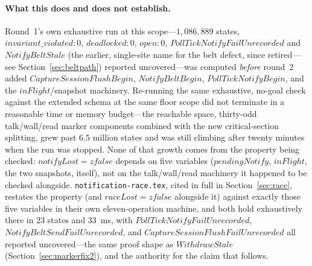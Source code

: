 \documentclass[a4paper,10pt,fleqn]{article}
\begin{document}
\paragraph{What this does and does not establish.}  Round~1's own
exhaustive run at this scope---$1{,}086{,}889$ states,
$invariant\_violated{:}0$, $deadlocked{:}0$, $open{:}0$,
$PollTickNotifyFailUnrecorded$ and $NotifyBeltStale$ (the earlier,
single-site name for the belt defect, since retired---see
Section~\ref{sec:beltpath}) reported uncovered---was computed \emph{before}
round~2 added $CaptureSessionFlushBegin$, $NotifyBeltBegin$,
$PollTickNotifyBegin$, and the $inFlight$/snapshot machinery.  Re-running
the same exhaustive, no-goal check against the extended schema at the
same floor scope did not terminate in a reasonable time or memory
budget---the reachable space, thirty-odd talk/wall/read marker
components combined with the new critical-section splitting, grew past
$6.5$ million states and was still climbing after twenty minutes when
the run was stopped.  None of that growth comes from the property being
checked: $notifyLost = zfalse$ depends on five variables
($pendingNotify$, $inFlight$, the two snapshots, itself), not on the
talk/wall/read machinery it happened to be checked alongside.
\texttt{notification-race.tex}, cited in full in
Section~\ref{sec:race}, restates the property (and $raceLost = zfalse$
alongside it) against exactly those five variables in their own
eleven-operation machine, and both hold exhaustively there in
$23$ states and $33$~ms, with $PollTickNotifyFailUnrecorded$,
$NotifyBeltSendFailUnrecorded$, and $CaptureSessionFlushFailUnrecorded$
all reported uncovered---the same proof shape as $WithdrawStale$
(Section~\ref{sec:markerfix2}), and the authority for the claim that
follows.
\end{document}
